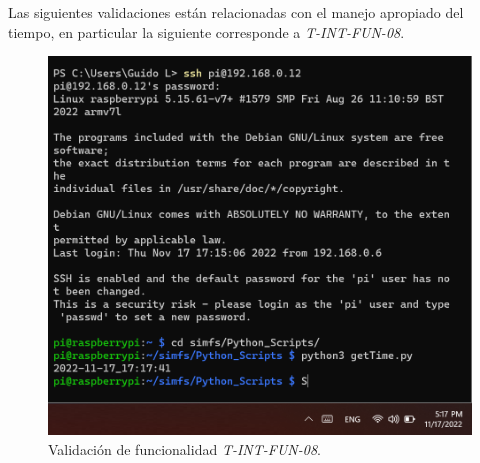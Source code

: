 Las siguientes validaciones están relacionadas con el manejo apropiado del tiempo, en particular la siguiente corresponde a \textit{T-INT-FUN-08}.
\begin{figure}[H]
	\centering
    \includegraphics[width=0.8\linewidth]{ImagenesValidacion del prototipo/TINTFUN8}
	\caption{Validación de funcionalidad \textit{T-INT-FUN-08}.}
\end{figure}

